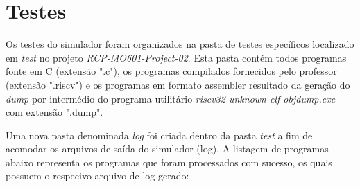 
\section{Testes}

Os testes do simulador foram organizados na pasta de testes específicos localizado em \textit{test} 
no projeto \textit{RCP-MO601-Project-02}. Esta pasta contém todos programas fonte em C (extensão ".c"), os programas compilados fornecidos pelo professor (extensão ".riscv") e os programas em formato assembler resultado da geração do \textit{dump} por intermédio do programa utilitário \textit{riscv32-unknown-elf-objdump.exe} com extensão ".dump".

Uma nova pasta denominada \textit{log} foi criada dentro da pasta \textit{test} a fim de acomodar os arquivos de saída do simulador (log). A listagem de programas abaixo representa os programas que foram processados com sucesso, os quais possuem o respecivo arquivo de log gerado:

